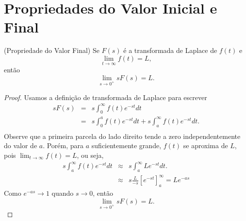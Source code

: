 \section{Propriedades do Valor Inicial e Final}
\begin{propr}(Propriedade do Valor Final) Se $F(s)$ é a transformada de Laplace de $f(t)$ e 
$$
\lim_{t\to\infty}f(t)=L,
$$
então
$$
\lim_{s\to 0^+} sF(s)=L.
$$
\end{propr}
\begin{proof}Usamos a definição de transformada de Laplace para escrever
\begin{eqnarray*}
sF(s)&=&s\int_0^\infty f(t)e^{-st}dt\\
&=&s\int_0^a f(t)e^{-st}dt+s\int_a^\infty f(t)e^{-st}dt.\\
\end{eqnarray*}
Observe que a primeira parcela do lado direito tende a zero independentemente do valor de $a$. Porém, para $a$ suficientemente grande, $f(t)$ se aproxima de $L$, pois $\displaystyle \lim_{t\to\infty}f(t)=L$, ou seja,
\begin{eqnarray*}
s\int_a^\infty f(t)e^{-st}dt &\approx &s\int_a^\infty L e^{-st}dt.\\
&\approx &s\frac{L}{-s}\left[ e^{-st}\right]_a^\infty=Le^{-as}
\end{eqnarray*}
Como $e^{-as}\to 1$ quando $s\to 0$, então
$$
\lim_{s\to 0^+} sF(s)=L.
$$ 
\end{proof}



